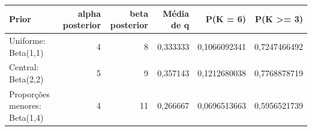 \begin{tabular}{lrrrrr}
\toprule
Prior & alpha posterior & beta posterior & Média de q & P(K = 6) & P(K >= 3) \\
\midrule
Uniforme: Beta(1,1) & 4 & 8 & 0,333333 & 0,1066092341 & 0,7247466492 \\
Central: Beta(2,2) & 5 & 9 & 0,357143 & 0,1212680038 & 0,7768878719 \\
Proporções menores: Beta(1,4) & 4 & 11 & 0,266667 & 0,0696513663 & 0,5956521739 \\
\bottomrule
\end{tabular}
